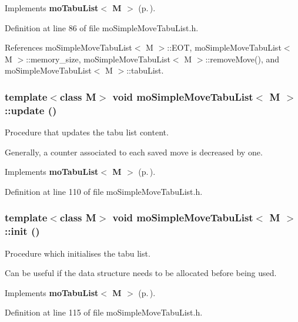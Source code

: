 Implements {\bf mo\-Tabu\-List$<$ M $>$} {\rm (p.\,\pageref{classmo_tabu_list_a0})}.

Definition at line 86 of file mo\-Simple\-Move\-Tabu\-List.h.

References mo\-Simple\-Move\-Tabu\-List$<$ M $>$::EOT, mo\-Simple\-Move\-Tabu\-List$<$ M $>$::memory\_\-size, mo\-Simple\-Move\-Tabu\-List$<$ M $>$::remove\-Move(), and mo\-Simple\-Move\-Tabu\-List$<$ M $>$::tabu\-List.
\subsubsection{\setlength{\rightskip}{0pt plus 5cm}template$<$class M$>$ void {\bf mo\-Simple\-Move\-Tabu\-List}$<$ M $>$::update ()\hspace{0.3cm}{\tt  [inline, virtual]}}\label{classmo_simple_move_tabu_list_a3}


Procedure that updates the tabu list content. 

Generally, a counter associated to each saved move is decreased by one. 

Implements {\bf mo\-Tabu\-List$<$ M $>$} {\rm (p.\,\pageref{classmo_tabu_list_a1})}.

Definition at line 110 of file mo\-Simple\-Move\-Tabu\-List.h.
\subsubsection{\setlength{\rightskip}{0pt plus 5cm}template$<$class M$>$ void {\bf mo\-Simple\-Move\-Tabu\-List}$<$ M $>$::init ()\hspace{0.3cm}{\tt  [inline, virtual]}}\label{classmo_simple_move_tabu_list_a4}


Procedure which initialises the tabu list. 

Can be useful if the data structure needs to be allocated before being used. 

Implements {\bf mo\-Tabu\-List$<$ M $>$} {\rm (p.\,\pageref{classmo_tabu_list_a2})}.

Definition at line 115 of file mo\-Simple\-Move\-Tabu\-List.h.
